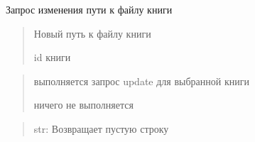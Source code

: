 \documentclass[letterpaper,10pt,russian]{sphinxmanual}
\begin{document}
\begin{fulllineitems}
\label{\detokenize{blueprints:blueprints.change_book_information.change_path_book}}
\pysigstartsignatures
{}
\pysigstopsignatures
\sphinxAtStartPar
Запрос изменения пути к файлу книги
\begin{description}
\begin{quote}\begin{description}
\sphinxAtStartPar
Новый путь к файлу книги

\sphinxAtStartPar
id книги

\end{description}\end{quote}

\begin{quote}\begin{description}
\sphinxAtStartPar
выполняется запрос update для выбранной книги

\sphinxAtStartPar
ничего не выполняется

\end{description}\end{quote}

\end{description}
\begin{quote}\begin{description}
\sphinxAtStartPar
str: Возвращает пустую строку

\end{description}\end{quote}

\end{fulllineitems}

\end{document}
